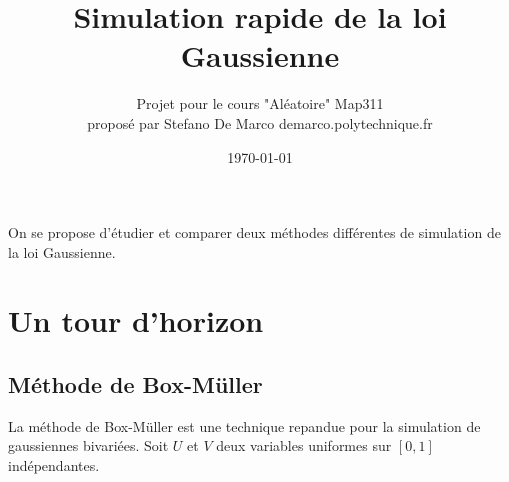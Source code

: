 \documentclass[a4paper]{article}
\title{Simulation rapide de la loi Gaussienne}
\author{Projet pour le cours "Al\'eatoire" Map311
\\propos\'e par Stefano De Marco demarco\@cmap.polytechnique.fr}
\date{\today}
\begin{document}
\maketitle

On se propose d'\'etudier et comparer deux m\'ethodes diff\'erentes de simulation de la loi Gaussienne.

\section{Un tour d'horizon}

\subsection{M\'ethode de Box-M\"uller}

La m\'ethode de Box-M\"uller est une technique repandue pour la simulation de gaussiennes bivari\'ees. Soit $U$ et $V$ deux variables uniformes sur $[0,1]$ ind\'ependantes.
\end{document}
